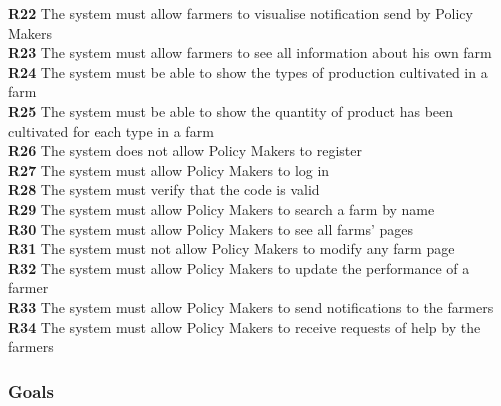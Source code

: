 \textbf{R22} The system must allow farmers to visualise notification send by Policy Makers\\
\textbf{R23} The system must allow farmers to see all information about his own farm\\
\textbf{R24} The system must be able to show the types of production cultivated in a farm\\
\textbf{R25} The system must be able to show the quantity of product has been cultivated for each type in a farm\\
\textbf{R26} The system does not allow Policy Makers to register\\
\textbf{R27} The system must allow Policy Makers to log in\\
\textbf{R28} The system must verify that the code is valid\\
\textbf{R29} The system must allow Policy Makers to search a farm by name\\
\textbf{R30} The system must allow Policy Makers to see all farms’ pages\\
\textbf{R31} The system must not allow Policy Makers to modify any farm page\\
\textbf{R32} The system must allow Policy Makers to update the performance of a farmer\\
\textbf{R33} The system must allow Policy Makers to send notifications to the farmers\\
\textbf{R34} The system must allow Policy Makers to receive requests of help by the farmers\\
\newpage

\subsubsection{Goals}

